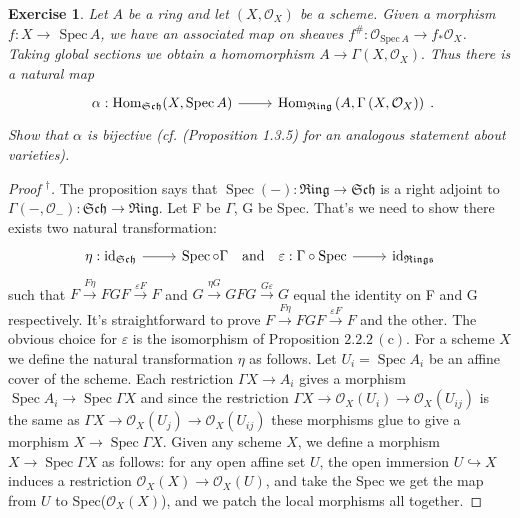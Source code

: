 \documentclass{amsart}
\newtheorem{exe}{Exercise}[subsection]
\begin{document}
\begin{exe}
	\label{2.2.4}
Let $A$ be a ring and let $(X, \mathcal{O}_{X}) $ be a scheme. Given a morphism $f: X \rightarrow$ $\mathrm{Spec}\, A$, we have an associated map on sheaves $f^{\#}: \mathcal{O}_{\mathrm{Spec}\, A} \rightarrow f_{*} \mathcal{O}_{X}$. Taking global sections we obtain a homomorphism $A \rightarrow \Gamma\left(X, \mathcal{O}_{X}\right) .$ Thus there is a natural map
\begin{equation*}
	\begin{tikzcd}
		{\alpha: \operatorname{Hom}_{\mathfrak{S c h}}(X, \operatorname{Spec} A)} \arrow[r] & {\operatorname{Hom}_{\mathfrak{R i n g}}\left(A, \Gamma\left(X, \mathcal{O}_{X}\right)\right)}
	\end{tikzcd}.
\end{equation*}
Show that $\alpha$ is bijective \textup{(cf. (Proposition 1.3.5) for an analogous statement about varieties)}.
\end{exe}
\begin{proof}[Proof $^\dag$]
The proposition says that $\operatorname{Spec}(-):\mathfrak{R i n g} \rightarrow \mathfrak{Sch} $ is a right adjoint to $\Gamma\left(-, \mathcal{O}_{-}\right): \mathfrak{S c h} \rightarrow \mathfrak{R i n g}$.  Let F be $\Gamma$, G be Spec. That's we need to show there exists two natural transformation:
\begin{equation*}
	\begin{tikzcd}
		\eta: \mathrm{i d}_{\mathfrak{S c h}} \arrow[r] & \operatorname{Spec} \circ \Gamma\quad \text{and}\quad \varepsilon:\Gamma \circ \mathrm{Spec} \arrow[r] & \mathrm{i d}_{\mathfrak{Rings}}
	\end{tikzcd}
\end{equation*}
such that
$F \xrightarrow{F \eta} F G F \xrightarrow{\varepsilon F} F$ and $G \xrightarrow{\eta G}G F G \xrightarrow{G \varepsilon} G$ equal the identity on F and G respectively. It's straightforward to prove $F \xrightarrow{F \eta} F G F \xrightarrow{\varepsilon F} F$ and the other. The obvious choice for $\varepsilon$ is the isomorphism of Proposition $2.2.2\,(\mathrm{c})$.  For a scheme $X$ we define the natural transformation $\eta$ as follows. Let $U_{i}=\operatorname{Spec} A_{i}$ be an affine cover of the scheme. Each restriction $\Gamma X \rightarrow A_{i}$ gives a morphism $\operatorname{Spec} A_{i} \rightarrow \operatorname{Spec} \Gamma X$ and since the restriction $\Gamma X \rightarrow \mathcal{O}_{X}\left(U_{i}\right) \rightarrow \mathcal{O}_{X}\left(U_{i j}\right)$ is the
same as $\Gamma X \rightarrow \mathcal{O}_{X}\left(U_{j}\right) \rightarrow \mathcal{O}_{X}\left(U_{i j}\right)$ these morphisms glue to give a morphism $X \rightarrow \operatorname{Spec} \Gamma X$. Given any scheme $X$, we define a morphism $X \rightarrow \operatorname{Spec} \Gamma X$ as follows: for any open affine set $U$, the open immersion $U\hookrightarrow X$ induces a restriction $\mathcal{O}_{X}(X)\rightarrow \mathcal{O}_{X}(U)$, and take the Spec we get the map from $U$ to Spec($\mathcal{O}_{X}(X)$), and we patch the local morphisms all together.
\end{proof}
\end{document}
